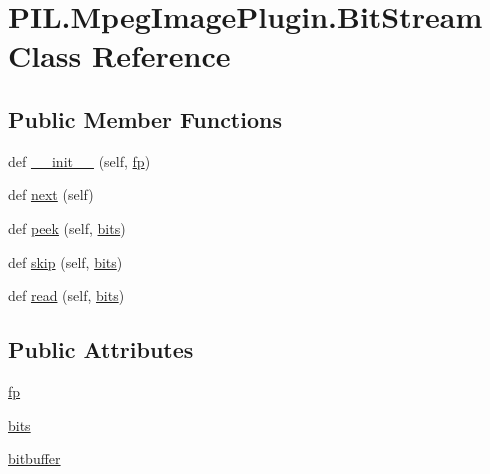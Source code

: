 \hypertarget{classPIL_1_1MpegImagePlugin_1_1BitStream}{}\section{P\+I\+L.\+Mpeg\+Image\+Plugin.\+Bit\+Stream Class Reference}
\label{classPIL_1_1MpegImagePlugin_1_1BitStream}
\subsection*{Public Member Functions}
\begin{DoxyCompactItemize}
\item 
def \hyperlink{classPIL_1_1MpegImagePlugin_1_1BitStream_abcc1b230b14c1b9ada97f870870d8cdc}{\+\_\+\+\_\+init\+\_\+\+\_\+} (self, \hyperlink{classPIL_1_1MpegImagePlugin_1_1BitStream_ac59726e01a176e0349f142a3b757142f}{fp})
\item 
def \hyperlink{classPIL_1_1MpegImagePlugin_1_1BitStream_ade29715740736e194d8760d653bfa114}{next} (self)
\item 
def \hyperlink{classPIL_1_1MpegImagePlugin_1_1BitStream_addba4c9f2032d192ff783b186bb60442}{peek} (self, \hyperlink{classPIL_1_1MpegImagePlugin_1_1BitStream_a9b28f0c4a6ecef5b51804cf941dfe583}{bits})
\item 
def \hyperlink{classPIL_1_1MpegImagePlugin_1_1BitStream_ae9e5b394f19552e20e55eb0e8c057c4f}{skip} (self, \hyperlink{classPIL_1_1MpegImagePlugin_1_1BitStream_a9b28f0c4a6ecef5b51804cf941dfe583}{bits})
\item 
def \hyperlink{classPIL_1_1MpegImagePlugin_1_1BitStream_a5a693f689b8de52639115ea1e8f43fc9}{read} (self, \hyperlink{classPIL_1_1MpegImagePlugin_1_1BitStream_a9b28f0c4a6ecef5b51804cf941dfe583}{bits})
\end{DoxyCompactItemize}
\subsection*{Public Attributes}
\begin{DoxyCompactItemize}
\item 
\hyperlink{classPIL_1_1MpegImagePlugin_1_1BitStream_ac59726e01a176e0349f142a3b757142f}{fp}
\item 
\hyperlink{classPIL_1_1MpegImagePlugin_1_1BitStream_a9b28f0c4a6ecef5b51804cf941dfe583}{bits}
\item 
\hyperlink{classPIL_1_1MpegImagePlugin_1_1BitStream_acb2eea0cb5f9a9c7936372004338c156}{bitbuffer}
\end{DoxyCompactItemize}


